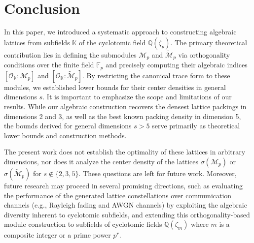 \documentclass{amsart}
\begin{document}
\section{Conclusion}

In this paper, we introduced a systematic approach to constructing algebraic lattices from subfields $\mathbb{K}$ of the cyclotomic field $\mathbb{Q}(\zeta_p)$. The primary theoretical contribution lies in defining the submodules $\mathcal{M}_p$ and $\tilde{\mathcal{M}}_p$ via orthogonality conditions over the finite field $\mathbb{F}_p$ and precisely computing their algebraic indices $[\mathcal{O}_{\mathbb{K}} : \mathcal{M}_p]$ and $[\mathcal{O}_{\mathbb{K}} : \tilde{\mathcal{M}}_p]$. By restricting the canonical trace form to these modules, we established lower bounds for their center densities in general dimensions $s$.  It is important to emphasize the scope and limitations of our results. While our algebraic construction recovers the densest lattice packings in dimensions 2 and 3, as well as the best known packing density in dimension 5, the bounds derived for general dimensions $s > 5$ serve primarily as theoretical lower bounds and construction methods.

The present work does not establish the optimality of these lattices in arbitrary dimensions, nor does it analyze the center density of the lattices $\sigma(\mathcal{M}_p)$ or $\sigma(\tilde{\mathcal{M}}_p)$ for $s \notin \{2, 3, 5\}$. These questions are left for future work. Moreover, future research may proceed in several promising directions, such as evaluating the performance of the generated lattice constellations over communication channels (e.g., Rayleigh fading and AWGN channels) by exploiting the algebraic diversity inherent to cyclotomic subfields, and extending this orthogonality-based module construction to subfields of cyclotomic fields $\mathbb{Q}(\zeta_m)$ where $m$ is a composite integer or a prime power $p^r$.
\end{document}
